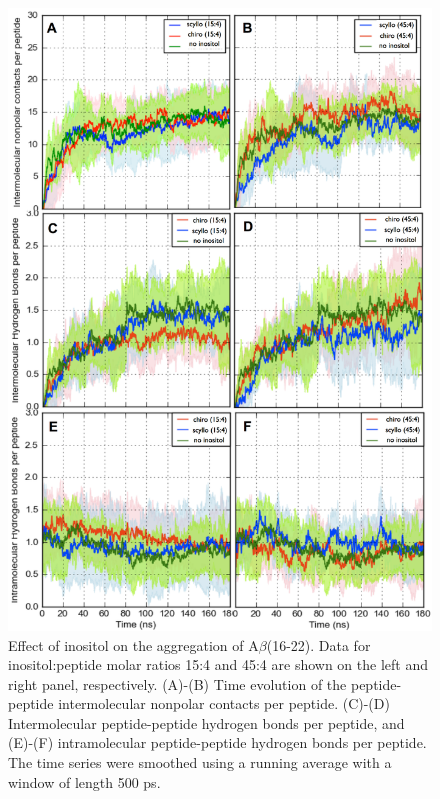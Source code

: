 \begin{figure}[ht]
\centering
\includegraphics[width=14cm]{figures/appendixA/inos2_figures_SI_disorderedContactTS.pdf}
\caption{Effect of inositol on the aggregation of A$\beta$(16-22). Data for inositol:peptide molar ratios 15:4 and 45:4 are shown on the left and right panel, respectively. (A)-(B) Time evolution of the peptide-peptide intermolecular nonpolar contacts per peptide. (C)-(D) Intermolecular peptide-peptide hydrogen bonds per peptide, and (E)-(F) intramolecular peptide-peptide hydrogen bonds per peptide. The time series were smoothed using a running average with a window of length 500 ps.}
\label{fig:SI-disorderedContactsTS}
\end{figure}

